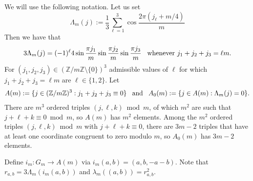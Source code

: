 \documentclass[11pt,reqno]{amsart}
\theoremstyle{remark}
\begin{document}
We will use the following notation. Let us set
\begin{equation}
\label{eq:beta-Lambda}
\Lambda_{m}(j) := \frac13\sum_{\ell=1}^3\cos\frac{2\pi(j_\ell+m/4)}{m}
\end{equation}
Then we have that
\begin{equation}\label{eq. 3Lambda explicit}
3\Lambda_{m}(j) = (-1)^\ell4\sin\frac{\pi j_1}{m}\sin\frac{\pi j_2}{m}\sin\frac{\pi j_3}{m}
\,\,\,\,\,
\text{\rm whenever $j_1+j_2+j_3=\ell m$.}
\end{equation}
For $(j_1,j_2,j_3)\in(\mathbb Z/m\mathbb Z \setminus \{0\})^3$ admissible values of $\ell$ for which $j_1+j_2+j_3=\ell m$ are $\ell\in\{1,2\}$.
Let
$$
A(m):=\{j\in(\mathbb Z/m\mathbb Z)^3 : j_1+j_2+j_3\equiv0\}
\,\,\,\,\,
\text{\rm and}
\,\,\,\,\,
A_0(m):=\{j\in A(m):\Lambda_{m}(j)=0\}.
$$
There are $m^{3}$ ordered triples $(j,\ell, k) \bmod m$, of which $m^2$ are such that
$j+\ell+k\equiv0\bmod m$, so $A(m)$ has $m^{2}$ elements.
Among the $m^2$ ordered triples
$(j,\ell,k)\bmod m$ with
$j+\ell+k\equiv0$, there are $3m-2$ triples that have at least one coordinate congruent to zero modulo $m$,
so $A_0(m)$ has $3m-2$ elements.


Define $i_m:G_m \rightarrow A(m)$ via $i_m(a,b)=(a,b,-a-b)$.
Note that $r_{a,b}=3\Lambda_m (i_m(a,b))$ and $\lambda_m((a,b))=r_{a,b}^2$.
\end{document}
